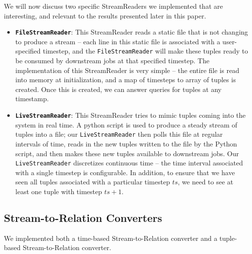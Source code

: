 \documentclass[a4paper, 10pt, conference]{IEEEconf}
\begin{document}
We will now discuss two specific StreamReaders we implemented that are interesting, and relevant to the results presented later in this paper.

\begin{itemize}
\item \textbf{\texttt{FileStreamReader}}: This StreamReader reads a static file that is not changing to produce a stream -- each line in this static file is associated with a user-specified timestep, and the \texttt{FileStreamReader} will make these tuples ready to be consumed by downstream jobs at that specified timestep.
The implementation of this StreamReader is very simple -- the entire file is read into memory at initialization, and a map of timesteps to array of tuples is created. Once this is created, we can answer queries for tuples at any timestamp.

\item \textbf{\texttt{LiveStreamReader}}: This StreamReader tries to mimic tuples coming into the system in real time. A python script is used to produce a steady stream of tuples into a file; our \texttt{LiveStreamReader} then polls this file at regular intervals of time, reads in the new tuples written to the file by the Python script, and then makes these new tuples available to downstream jobs.
Our \texttt{LiveStreamReader} discretizes continuous time -- the time interval associated with a single timestep is configurable. In addition, to ensure that we have seen all tuples associated with a particular timestep $ts$, we need to see at least one tuple with timestep $ts + 1$.
\end{itemize}


\subsection{Stream-to-Relation Converters}
We implemented both a time-based Stream-to-Relation converter and a tuple-based Stream-to-Relation converter. 
\end{document}
